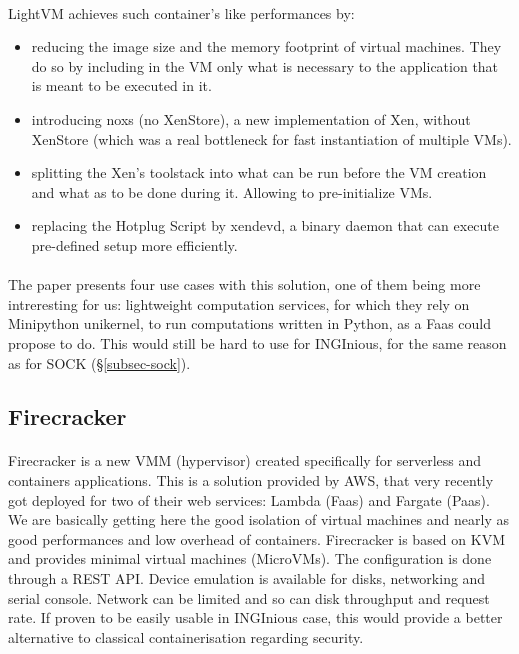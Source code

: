 \paragraph{}LightVM achieves such container's like performances by:
\begin{itemize}
\renewcommand\labelitemi{--}
  \item reducing the image size and the memory footprint of virtual machines.  They do so by including in the VM only what is necessary to the application that is meant to be executed in it.
  \item introducing noxs (no XenStore), a new implementation of Xen, without XenStore (which was a real bottleneck for fast instantiation of multiple VMs).
  \item splitting the Xen's toolstack into what can be run before the VM creation and what as to be done during it.  Allowing to pre-initialize VMs.
  \item replacing the Hotplug Script by xendevd, a binary daemon that can execute pre-defined setup more efficiently.
\end{itemize}

\paragraph{}The paper presents four use cases with this solution, one of them being more intreresting for us: lightweight computation services, for which they rely on Minipython unikernel, to run computations written in Python, as a Faas could propose to do.  This would still be hard to use for INGInious, for the same reason as for SOCK (§\ref{subsec-sock}).

\subsection{Firecracker} 
\paragraph{} Firecracker is a new VMM (hypervisor) created specifically for serverless and containers applications.  \cite{agachefirecracker}  This is a solution provided by AWS, that very recently got deployed for two of their web services: Lambda (Faas) and Fargate (Paas).  We are basically getting here the good isolation of virtual machines and nearly as good performances and low overhead of containers.  Firecracker is based on KVM and provides minimal virtual machines (MicroVMs).  The configuration is done through a REST API.  Device emulation is available for disks, networking and serial console.  Network can be limited and so can disk throughput and request rate.  If proven to be easily usable in INGInious case, this would provide a better alternative to classical containerisation regarding security.

